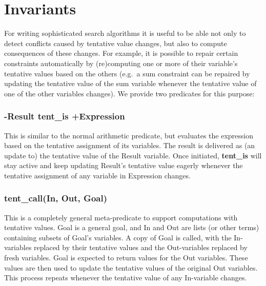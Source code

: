 \section{Invariants}

For writing sophisticated search algorithms it is useful to be able
not only to detect conflicts caused by tentative value changes,
but also to compute consequences of these changes.
For example, it is possible to repair certain constraints automatically
by (re)computing one or more of their variable's tentative values
based on the others (e.g.\ a sum constraint can be repaired by updating
the tentative value of the sum variable whenever the tentative value of one of
the other variables changes).
We provide two predicates for this purpose: 

\subsubsection{-Result tent_is +Expression}
This is similar to the normal arithmetic
predicate, but evaluates the expression based on the tentative
assignment of its variables. The result is delivered as (an update to)
the tentative value of the Result variable.
Once initiated, {\bf tent_is} will stay active and keep updating Result's
tentative value eagerly whenever the tentative assignment of any
variable in Expression changes.

\subsubsection{tent_call(In, Out, Goal)}
This is a completely general meta-predicate to support computations
with tentative values. Goal is a general goal, and In and Out are
lists (or other terms) containing subsets of Goal's variables.
A copy of Goal is called, with the In-variables replaced by their
tentative values and the Out-variables replaced by fresh variables.
Goal is expected to return values for the Out variables. These values
are then used to update the tentative values of the original Out variables.
This process repeats whenever the tentative value of any In-variable
changes.


